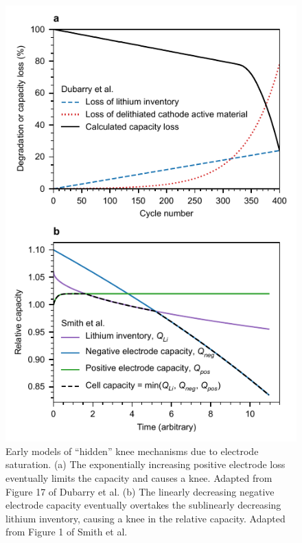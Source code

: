 \documentclass[journal=jpclcd,manuscript=article]{achemso}
\begin{document}
\begin{figure}[hp]
\centering
\includegraphics[scale = 1]{final_figures/electrode_saturation.pdf}
\caption{Early models of ``hidden'' knee mechanisms due to electrode saturation. (a) The exponentially increasing positive electrode loss eventually limits the capacity and causes a knee. Adapted from Figure 17 of Dubarry et al.\cite{dubarry_synthesize_2012}
(b) The linearly decreasing negative electrode capacity eventually overtakes the sublinearly decreasing lithium inventory, causing a knee in the relative capacity. Adapted from Figure 1 of Smith et al.\cite{smith_life_2017}
}
\label{fig:electrode_sat_simple}
\end{figure}
\end{document}
